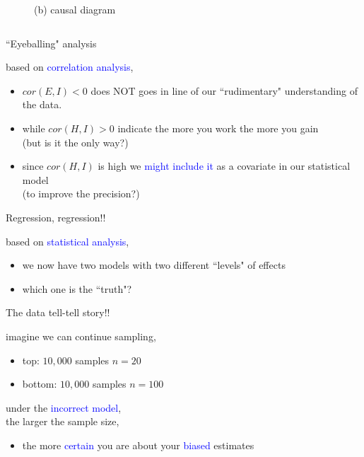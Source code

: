 \begin{frame}
\begin{columns}
\begin{column}{0.5\textwidth}
\begin{figure}
				\caption*{(b) causal diagram}
			\end{figure}
		\end{column}
	\end{columns}
\end{frame}
%
%
\begin{lhframe}[rhgraphic={\texttt{[image: descendant3\_panel.pdf]}}]
	{``Eyeballing" analysis}
	
	based on \textcolor{blue}{correlation analysis},
	\begin{itemize}
		\item $cor(E, I)<0$ does NOT goes in line of our ``rudimentary" understanding of the data.
		\item while $cor(H, I)>0$ indicate the more you work the more you gain \\
		{\small (but is it the only way?)}
		\item since $cor(H, I)$ is high we \textcolor{blue}{might include it} as a covariate in our statistical model \\
		{\small (to improve the precision?)}
	\end{itemize}
\end{lhframe}
%
%
\begin{lhframe}[rhgraphic={\texttt{[image: descendant3\_reg.png]}}]
	{Regression, regression!!}
	
	based on \textcolor{blue}{statistical analysis},
	\begin{itemize}
		\item we now have two models with two different ``levels" of effects
		\item which one is the ``truth"?
	\end{itemize}
\end{lhframe}
%
%
\begin{lhframe}[rhgraphic={\texttt{[image: descendant3\_samplesize.pdf]}}]
	{The data tell-tell story!!}
	
	imagine we can continue sampling,
	\begin{itemize}
		\item top: $10,000$ samples $n=20$
		\item bottom: $10,000$ samples $n=100$
	\end{itemize}
	
	under the \textcolor{blue}{incorrect model},\\
	the larger the sample size,
	\begin{itemize}
		\item the more \textcolor{blue}{certain} you are about your \textcolor{blue}{biased} estimates
	\end{itemize}
\end{lhframe}
